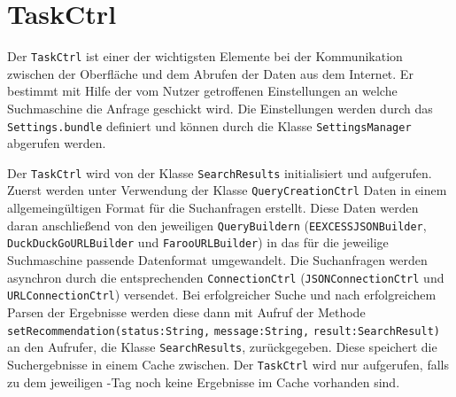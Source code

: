 
\section{TaskCtrl}

Der \lstinline|TaskCtrl| ist einer der wichtigsten Elemente bei der Kommunikation zwischen der Oberfläche und dem Abrufen der Daten aus dem Internet. Er bestimmt mit Hilfe der vom Nutzer getroffenen Einstellungen an welche Suchmaschine die Anfrage geschickt wird. Die Einstellungen werden durch das \lstinline|Settings.bundle| definiert und können durch die Klasse \lstinline|SettingsManager| abgerufen werden. 

Der \lstinline|TaskCtrl| wird von der Klasse \lstinline|SearchResults| initialisiert und aufgerufen. Zuerst werden unter Verwendung der Klasse \lstinline|QueryCreationCtrl| Daten in einem allgemeingültigen Format für die Suchanfragen erstellt. Diese Daten werden daran anschließend von den jeweiligen \lstinline|QueryBuildern| (\lstinline|EEXCESSJSONBuilder|, \lstinline|DuckDuckGoURLBuilder| und \lstinline|FarooURLBuilder|) in das für die jeweilige Suchmaschine passende Datenformat umgewandelt. Die Suchanfragen werden asynchron durch die entsprechenden \verb|ConnectionCtrl| (\lstinline|JSONConnectionCtrl| und \lstinline|URLConnectionCtrl|) versendet. Bei erfolgreicher Suche und nach erfolgreichem Parsen der Ergebnisse werden diese dann mit Aufruf der Methode \lstinline|setRecommendation(|\lstinline|status:String,| \lstinline|message:String,| \lstinline|result:SearchResult)| an den Aufrufer, die Klasse \lstinline|SearchResults|, zurückgegeben. Diese speichert die Suchergebnisse in einem Cache zwischen. Der \lstinline|TaskCtrl| wird nur aufgerufen, falls zu dem jeweiligen \SEARCH-Tag noch keine Ergebnisse im Cache vorhanden sind. 


